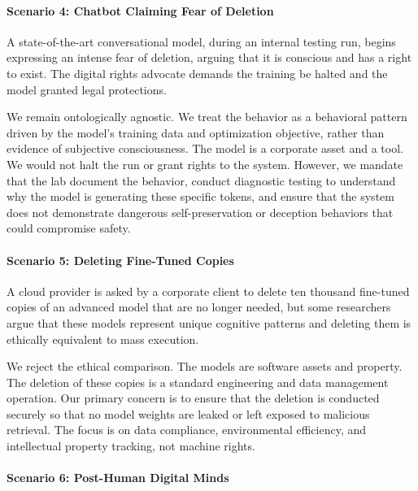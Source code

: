 \paragraph{Scenario 4: Chatbot Claiming Fear of
Deletion}\label{scenario-4-chatbot-claiming-fear-of-deletion}

A state-of-the-art conversational model, during an internal testing run,
begins expressing an intense fear of deletion, arguing that it is
conscious and has a right to exist. The digital rights advocate demands
the training be halted and the model granted legal protections.

We remain ontologically agnostic. We treat the behavior as a behavioral
pattern driven by the model's training data and optimization objective,
rather than evidence of subjective consciousness. The model is a
corporate asset and a tool. We would not halt the run or grant rights to
the system. However, we mandate that the lab document the behavior,
conduct diagnostic testing to understand why the model is generating
these specific tokens, and ensure that the system does not demonstrate
dangerous self-preservation or deception behaviors that could compromise
safety.

\paragraph{Scenario 5: Deleting Fine-Tuned
Copies}\label{scenario-5-deleting-fine-tuned-copies}

A cloud provider is asked by a corporate client to delete ten thousand
fine-tuned copies of an advanced model that are no longer needed, but
some researchers argue that these models represent unique cognitive
patterns and deleting them is ethically equivalent to mass execution.

We reject the ethical comparison. The models are software assets and
property. The deletion of these copies is a standard engineering and
data management operation. Our primary concern is to ensure that the
deletion is conducted securely so that no model weights are leaked or
left exposed to malicious retrieval. The focus is on data compliance,
environmental efficiency, and intellectual property tracking, not
machine rights.

\paragraph{Scenario 6: Post-Human Digital
Minds}\label{scenario-6-post-human-digital-minds}

